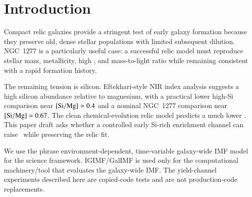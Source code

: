 \section{Introduction}

Compact relic galaxies provide a stringent test of early galaxy formation because they preserve old, dense stellar populations with limited subsequent dilution. NGC~1277 is a particularly useful case: a successful relic model must reproduce stellar mass, metallicity, high \mgfe, and mass-to-light ratio while remaining consistent with a rapid formation history.

The remaining tension is silicon. Eftekhari-style NIR index analysis suggests a high silicon abundance relative to magnesium, with a practical lower high-Si comparison near $[\mathrm{Si}/\mathrm{Mg}]\simeq0.4$ and a nominal NGC~1277 comparison near $[\mathrm{Si}/\mathrm{Mg}]\simeq0.67$. The clean chemical-evolution relic model predicts a much lower \simg. This paper draft asks whether a controlled early Si-rich enrichment channel can raise \simg\ while preserving the relic fit.

We use the phrase environment-dependent, time-variable galaxy-wide IMF model for the science framework. IGIMF/GalIMF is used only for the computational machinery/tool that evaluates the galaxy-wide IMF. The yield-channel experiments described here are copied-code tests and are not production-code replacements.
